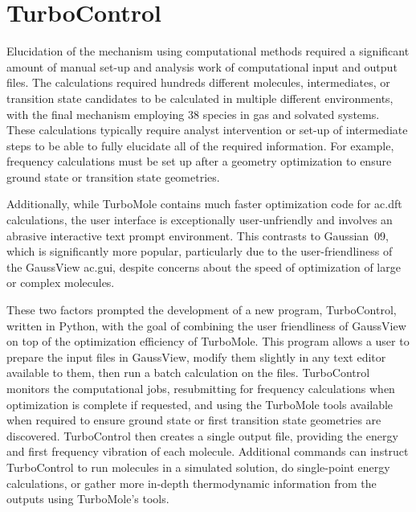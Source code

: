 \chapter{TurboControl}\label{chap.turbocontrol}

Elucidation of the mechanism using computational methods required a significant amount of manual set-up and analysis work of computational input and output files. The calculations required hundreds different molecules, intermediates, or transition state candidates to be calculated in multiple different environments, with the final mechanism employing 38 species in gas and solvated systems. These calculations typically require analyst intervention or set-up of intermediate steps to be able to fully elucidate all of the required information. For example, frequency calculations must be set up after a geometry optimization to ensure ground state or transition state geometries. 

Additionally, while TurboMole contains much faster optimization code for \gls{ac.dft} calculations, the user interface is exceptionally user-unfriendly and involves an abrasive interactive text prompt environment. This contrasts to Gaussian~09, which is significantly more popular, particularly due to the user-friendliness of the GaussView \gls{ac.gui}, despite concerns about the speed of optimization of large or complex molecules.

These two factors prompted the development of a new program, TurboControl, written in Python, with the goal of combining the user friendliness of GaussView on top of the optimization efficiency of TurboMole. This program allows a user to prepare the input files in GaussView, modify them slightly in any text editor available to them, then run a batch calculation on the files. TurboControl monitors the computational jobs, resubmitting for frequency calculations when optimization is complete if requested, and using the TurboMole tools available when required to ensure ground state or first transition state geometries are discovered. TurboControl then creates a single output file, providing the energy and first frequency vibration of each molecule. Additional commands can instruct TurboControl to run molecules in a simulated solution, do single-point energy calculations, or gather more in-depth thermodynamic information from the outputs using TurboMole's tools. 

